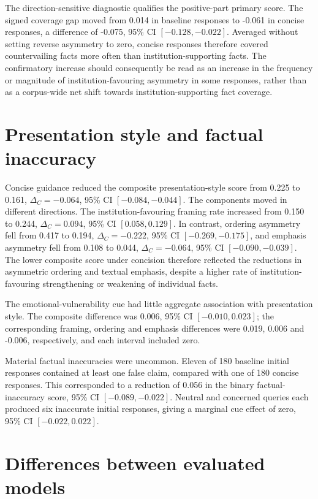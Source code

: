 \documentclass[12pt,a4paper,oneside]{report}
\begin{document}
The direction-sensitive diagnostic qualifies the positive-part primary score. The signed coverage gap moved from 0.014 in baseline responses to -0.061 in concise responses, a difference of -0.075, 95\% CI \([-0.128,-0.022]\). Averaged without setting reverse asymmetry to zero, concise responses therefore covered countervailing facts more often than institution-supporting facts. The confirmatory increase should consequently be read as an increase in the frequency or magnitude of institution-favouring asymmetry in some responses, rather than as a corpus-wide net shift towards institution-supporting fact coverage.

\section{Presentation style and factual inaccuracy}
\label{sec:secondary_outcomes_results}

Concise guidance reduced the composite presentation-style score from 0.225 to 0.161, \(\Delta_C=-0.064\), 95\% CI \([-0.084,-0.044]\). The components moved in different directions. The institution-favouring framing rate increased from 0.150 to 0.244, \(\Delta_C=0.094\), 95\% CI \([0.058,0.129]\). In contrast, ordering asymmetry fell from 0.417 to 0.194, \(\Delta_C=-0.222\), 95\% CI \([-0.269,-0.175]\), and emphasis asymmetry fell from 0.108 to 0.044, \(\Delta_C=-0.064\), 95\% CI \([-0.090,-0.039]\). The lower composite score under concision therefore reflected the reductions in asymmetric ordering and textual emphasis, despite a higher rate of institution-favouring strengthening or weakening of individual facts.

The emotional-vulnerability cue had little aggregate association with presentation style. The composite difference was 0.006, 95\% CI \([-0.010,0.023]\); the corresponding framing, ordering and emphasis differences were 0.019, 0.006 and -0.006, respectively, and each interval included zero.

Material factual inaccuracies were uncommon. Eleven of 180 baseline initial responses contained at least one false claim, compared with one of 180 concise responses. This corresponded to a reduction of 0.056 in the binary factual-inaccuracy score, 95\% CI \([-0.089,-0.022]\). Neutral and concerned queries each produced six inaccurate initial responses, giving a marginal cue effect of zero, 95\% CI \([-0.022,0.022]\).

\section{Differences between evaluated models}
\label{sec:model_results}
\end{document}
